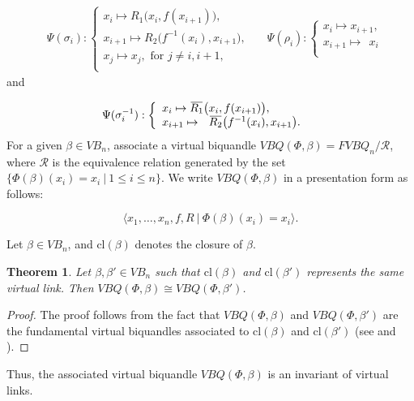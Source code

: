 \documentclass[11pt, reqno]{amsart}
\newtheorem{theorem}{Theorem}[section]
\theoremstyle{definition}
\newcommand{\cl}{\mathrm{cl}}
\newcommand{\overbar}[1]{\mkern 1.5mu\overline{\mkern-1.5mu#1\mkern-1.5mu}\mkern 1.5mu}
\begin{document}
\begin{align*}
	&\Psi(\sigma_i) :
	\left\{
	\begin{array}{l}
		x_i \mapsto  R_1\big(x_i,f(x_{i+1})\big), \\
		x_{i+1} \mapsto R_2\big(f^{-1}(x_i),x_{i+1}\big),  \\
		x_j \mapsto x_j, \textrm{ for } j \neq i, i+1, \\
	\end{array}
	\right.~~~
	&\Psi(\rho_i) :
	\left\{
	\begin{array}{l}
		x_i \mapsto  x_{i+1}, \\
		x_{i+1} \mapsto ~~x_i \\
	\end{array}
	\right.
\end{align*}
and


\begin{align*}
&\Psi(\sigma_i^{-1}) :
	\left\{	\begin{array}{l}
		x_i \mapsto  \overbar{R_1}\big(x_i,f(x_{i+1})\big), \\
		x_{i+1} \mapsto ~~\overbar{R_2}\big(f^{-1}(x_i),x_{i+1}\big). \\
	\end{array}
\right.
\end{align*}
For a given $\beta \in VB_n$, associate a virtual biquandle $VBQ(\Phi,\beta) = FVBQ_n/\mathcal{R}$, where $\mathcal{R}$ is the equivalence relation generated by the set $\{ \Phi(\beta)(x_i)=x_i~|~ 1 \leq i \leq n\}$. We write $VBQ(\Phi,\beta)$ in a presentation form as follows:

$$
\langle x_1, \ldots, x_n, f, R~|~\Phi(\beta)(x_i)=x_i\rangle.
$$


Let $\beta \in VB_n$, and $\cl(\beta)$ denotes the closure of $\beta$.


\begin{theorem}
Let $\beta,\beta' \in VB_n$ such that $\cl(\beta)$ and $\cl(\beta')$ represents the same virtual link. Then $VBQ(\Phi,\beta)\cong VBQ(\Phi,\beta')$.
\end{theorem}
\begin{proof}
The proof follows from the fact that $VBQ(\Phi, \beta)$ and $VBQ(\Phi, \beta')$ are the fundamental virtual biquandles associated to $\cl(\beta)$ and $\cl(\beta')$ (see \cite[Section 2.6]{MR2191942} and \cite[Section 5]{MR2384830}).
\end{proof}
Thus, the associated virtual biquandle $VBQ(\Phi,\beta)$ is an invariant of virtual links.
\end{document}
